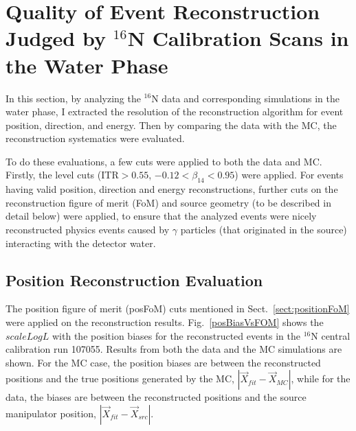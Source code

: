 \section{Quality of Event Reconstruction Judged by $^{16}$N Calibration Scans in the Water Phase}

In this section, by analyzing the $^{16}$N data and corresponding simulations in the water phase, I extracted the resolution of the reconstruction algorithm for event position, direction, and energy. Then by comparing the data with the MC, the reconstruction systematics were evaluated.

To do these evaluations, a few cuts were applied to both the data and MC. Firstly, the level cuts (ITR$>0.55$, $-0.12<\beta_{14}<0.95$) were applied. For events having valid position, direction and energy reconstructions, further cuts on the reconstruction figure of merit (FoM) and source geometry (to be described in detail below) were applied, to ensure that the analyzed events were nicely reconstructed physics events caused by $\gamma$ particles (that originated in the source) interacting with the detector water.

\subsection{Position Reconstruction Evaluation}

The position figure of merit (posFoM) cuts mentioned in Sect.~\ref{sect:positionFoM} were applied on the reconstruction results. Fig.~\ref{posBiasVsFOM} shows the $scaleLogL$ with the position biases for the reconstructed events in the $^{16}$N central calibration run 107055. Results from both the data and the MC simulations are shown. For the MC case, the position biases are between the reconstructed positions and the true positions generated by the MC, $|\vec{X}_{fit}-\vec{X}_{MC}|$, while for the data, the biases are between the reconstructed positions and the source manipulator position, $|\vec{X}_{fit}-\vec{X}_{src}|$.

